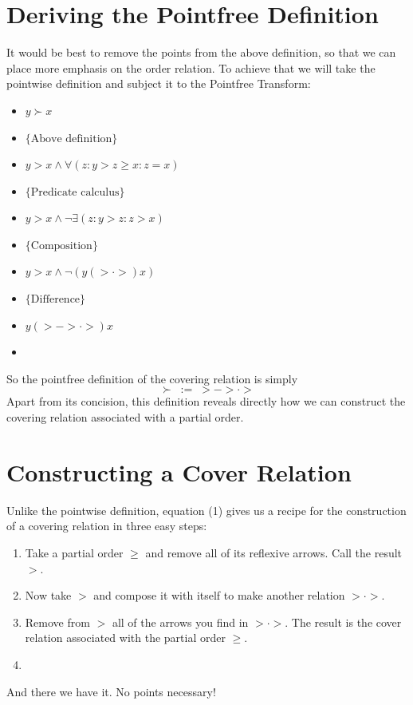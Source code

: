\documentclass{article}
\begin{document}
\section{Deriving the Pointfree Definition}
It would be best to remove the points from the above definition, so that we can place more emphasis on the order relation.  To achieve that we will take the pointwise definition and subject it to the Pointfree Transform:
\begin{itemize}
    \item $y \succ x$
    \item[$\equiv$] $\{\text{Above definition}\}$
    \item[] $y > x \wedge \forall(z : y > z \geq x : z = x )$
    \item[$\equiv$] $\{\text{Predicate calculus}\}$
    \item[] $y > x \wedge \neg \exists(z : y > z : z > x )$
    \item[$\equiv$] $\{\text{Composition}\}$
    \item[] $y > x \wedge \neg (y (> \cdot >) x )$
    \item[$\equiv$] $\{\text{Difference}\}$
    \item[] $y(> - > \cdot >)x$
    \item[\Heart]
\end{itemize}
So the pointfree definition of the covering relation is simply
\begin{equation}
    \succ \; := \; > - > \cdot >
\end{equation}
Apart from its concision, this definition reveals directly how we can construct the covering relation associated with a partial order.

\section{Constructing a Cover Relation}
Unlike the pointwise definition, equation (1) gives us a recipe for the construction of a covering relation in three easy steps:
\begin{enumerate}
    \item Take a partial order $\geq$ and remove all of its reflexive arrows.  Call the result $>$.
    \item Now take $>$ and compose it with itself to make another relation $> \cdot >$.
    \item Remove from $>$ all of the arrows you find in $> \cdot >$.  The result is the cover relation associated with the partial order $\geq$.
    \item[\Heart]
\end{enumerate}
And there we have it. No points necessary!



\end{document}
